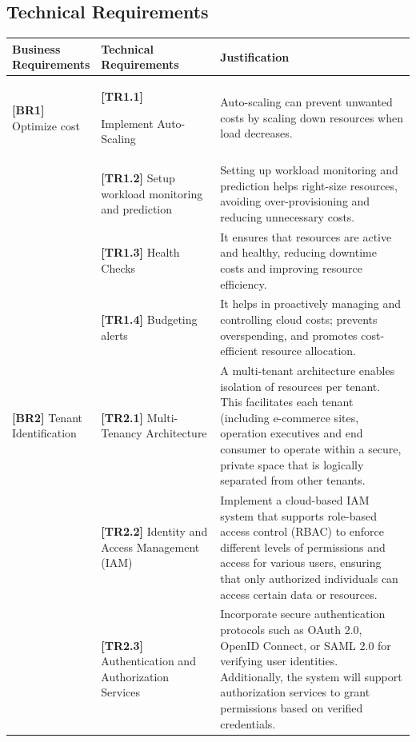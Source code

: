 \documentclass{article}
\begin{document}
\subsection{Technical Requirements} \label{trs}
\begin{table}[H]
    \centering
    \def\arraystretch{1.75}
    \begin{tabular}{|p{0.2\linewidth}| p{0.3\linewidth} | p{0.5\linewidth} |} \hline 
         \textbf{Business Requirements} &  \textbf{Technical Requirements} & \textbf{Justification}\\ \hline 
         \textbf{[BR1]} Optimize cost &  \textbf{[TR1.1]} 
         
         Implement Auto-Scaling &  Auto-scaling can prevent unwanted costs by scaling down resources when load decreases. \cite{{Auto-Scaling}}\\ \hline 
         &  \textbf{[TR1.2]} Setup workload monitoring and  
         prediction & Setting up workload monitoring and prediction helps right-size resources, avoiding over-provisioning and reducing unnecessary costs. \\ \hline 
         &  \textbf{[TR1.3]} Health Checks & It ensures that resources are active and healthy, reducing downtime costs and improving resource efficiency. \cite{Health check} \\ \hline 
         &  \textbf{[TR1.4]} Budgeting alerts & It helps in proactively managing and controlling cloud costs; prevents overspending, and promotes cost-efficient resource allocation.\cite{Budget}\\ \hline 
         \textbf{[BR2]} Tenant Identification&  \textbf{[TR2.1]} Multi-Tenancy Architecture & A multi-tenant architecture enables isolation of resources per tenant. This facilitates each tenant (including e-commerce sites, operation executives and end consumer to operate within a secure, private space that is logically separated from other tenants. \cite{multi-tenancy}\\ \hline 
         &  \textbf{[TR2.2]} Identity and Access Management (IAM)&  Implement a cloud-based IAM system that supports role-based access control (RBAC) to enforce different levels of permissions and access for various users, ensuring that only authorized individuals can access certain data or resources.\cite{IAM}\\  \hline 
         &  \textbf{[TR2.3]} Authentication and Authorization Services&  Incorporate secure authentication protocols such as OAuth 2.0, OpenID Connect, or SAML 2.0 for verifying user identities. Additionally, the system will support authorization services to grant permissions based on verified credentials.\\ \hline 

\end{tabular}
\end{table}
\end{document}
